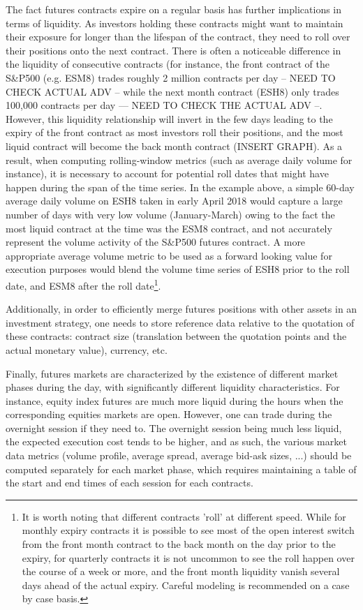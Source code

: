 \begin{itemize}
The fact futures contracts expire on a regular basis has further implications in terms of liquidity. As investors holding these contracts might want to maintain their exposure for longer than the lifespan of the contract, they need to roll over their positions onto the next contract. There is often a noticeable difference in the liquidity of consecutive contracts (for instance, the front contract of the S\&P500 (e.g. ESM8) trades roughly 2 million contracts per day -- NEED TO CHECK ACTUAL ADV -- while the next month contract (ESH8) only trades 100,000 contracts per day --- NEED TO CHECK THE ACTUAL ADV --. However, this liquidity relationship will invert in the few days leading to the expiry of the front contract as most investors roll their positions, and the most liquid contract will become the back month contract (INSERT GRAPH). As a result, when computing rolling-window metrics (such as average daily volume for instance), it is necessary to account for potential roll dates that might have happen during the span of the time series. In the example above, a simple 60-day average daily volume on ESH8 taken in early April 2018 would capture a large number of days with very low volume (January-March) owing to the fact the most liquid contract at the time was the ESM8 contract, and not accurately represent the volume activity of the S\&P500 futures contract. A more appropriate average volume metric to be used as a forward looking value for execution purposes would blend the volume time series of ESH8 prior to the roll date, and ESM8 after the roll date\footnote{It is worth noting that different contracts 'roll' at different speed. While for monthly expiry contracts it is possible to see most of the open interest switch from the front month contract to the back month on the day prior to the expiry, for quarterly contracts it is not uncommon to see the roll happen over the course of a week or more, and the front month liquidity vanish several days ahead of the actual expiry. Careful modeling is recommended on a case by case basis.}. 

Additionally, in order to efficiently merge futures positions with other assets in an investment strategy, one needs to store reference data relative to the quotation of these contracts: contract size (translation between the quotation points and the actual monetary value), currency, etc. 

Finally, futures markets are characterized by the existence of different market phases during the day, with significantly different liquidity characteristics. For instance, equity index futures are much more liquid during the hours when the corresponding equities markets are open. However, one can trade during the overnight session if they need to. The overnight session being much less liquid, the expected execution cost tends to be higher, and as such, the various market data metrics (volume profile, average spread, average bid-ask sizes, ...) should be computed separately for each market phase, which requires maintaining a table of the start and end times of each session for each contracts. 


\end{itemize}
